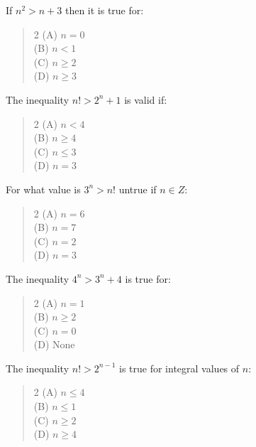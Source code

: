 \documentclass[11pt,a4paper]{article}
\begin{document}
\begin{mcqlist}
\item If $n^2>n+3$ then it is true for:
\begin{quote}\begin{multicols}{2}
\noindent (A) $n=0$ \\
(B) $n<1$ \\
(C) $n\geq2$ \\
(D) $n\geq3$
\end{multicols}\end{quote}

\item The inequality $n!>2^n+1$ is valid if:
\begin{quote}\begin{multicols}{2}
\noindent (A) $n<4$ \\
(B) $n\geq4$ \\
(C) $n\leq3$ \\
(D) $n=3$
\end{multicols}\end{quote}

\item For what value is $3^n>n!$ untrue if $n\in Z$:
\begin{quote}\begin{multicols}{2}
\noindent (A) $n=6$ \\
(B) $n=7$ \\
(C) $n=2$ \\
(D) $n=3$
\end{multicols}\end{quote}

\item The inequality $4^n>3^n+4$ is true for:
\begin{quote}\begin{multicols}{2}
\noindent (A) $n=1$ \\
(B) $n\geq2$ \\
(C) $n=0$ \\
(D) None
\end{multicols}\end{quote}

\item The inequality $n!>2^{n-1}$ is true for integral values of $n$:
\begin{quote}\begin{multicols}{2}
\noindent (A) $n\leq4$ \\
(B) $n\leq1$ \\
(C) $n\geq2$ \\
(D) $n\geq4$
\end{multicols}\end{quote}


\end{mcqlist}
\end{document}
